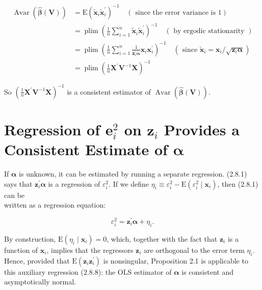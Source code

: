 \documentclass[10pt]{article}
\begin{document}
\begin{align*}
\operatorname{Avar}(\widehat{\boldsymbol{\beta}}(\mathbf{V})) & =\mathrm{E}\left(\tilde{\mathbf{x}}_{i} \tilde{\mathbf{x}}_{i}^{\prime}\right)^{-1} \quad(\text { since the error variance is } 1) \\
& =\operatorname{plim}\left(\frac{1}{n} \sum_{i=1}^{n} \tilde{\mathbf{x}}_{i} \tilde{\mathbf{x}}_{i}^{\prime}\right)^{-1} \quad(\text { by ergodic stationarity }) \\
& =\operatorname{plim}\left(\frac{1}{n} \sum_{i=1}^{n} \frac{1}{\mathbf{z}_{i}^{\prime} \boldsymbol{\alpha}} \mathbf{x}_{i} \mathbf{x}_{i}^{\prime}\right)^{-1} \quad\left(\text { since } \tilde{\mathbf{x}}_{i}=\mathbf{x}_{i} / \sqrt{\mathbf{z}_{i} \boldsymbol{\alpha}}\right) \\
& =\operatorname{plim}\left(\frac{1}{n} \mathbf{X}^{\prime} \mathbf{V}^{-1} \mathbf{X}\right)^{-1} \tag{2.8.7}
\end{align*}


So $\left(\frac{1}{n} \mathbf{X}^{\prime} \mathbf{V}^{-1} \mathbf{X}\right)^{-1}$ is a consistent estimator of $\operatorname{Avar}(\widehat{\boldsymbol{\beta}}(\mathbf{V}))$.

\section*{Regression of $\boldsymbol{e}_{i}^{2}$ on $\mathbf{z}_{i}$ Provides a Consistent Estimate of $\boldsymbol{\alpha}$}
If $\boldsymbol{\alpha}$ is unknown, it can be estimated by running a separate regression. (2.8.1) says that $\mathbf{z}_{i}^{\prime} \boldsymbol{\alpha}$ is a regression of $\varepsilon_{i}^{2}$. If we define $\eta_{i} \equiv \varepsilon_{i}^{2}-\mathrm{E}\left(\varepsilon_{i}^{2} \mid \mathbf{x}_{i}\right)$, then (2.8.1) can be\\
written as a regression equation:


\begin{equation*}
\varepsilon_{i}^{2}=\mathbf{z}_{i}^{\prime} \boldsymbol{\alpha}+\eta_{i} . \tag{2.8.8}
\end{equation*}


By construction, $\mathrm{E}\left(\eta_{i} \mid \mathbf{x}_{i}\right)=0$, which, together with the fact that $\mathbf{z}_{i}$ is a function of $\mathbf{x}_{i}$, implies that the regressors $\mathbf{z}_{i}$ are orthogonal to the error term $\eta_{i}$. Hence, provided that $\mathrm{E}\left(\mathbf{z}_{i} \mathbf{z}_{i}^{\prime}\right)$ is nonsingular, Proposition 2.1 is applicable to this auxiliary regression (2.8.8): the OLS estimator of $\boldsymbol{\alpha}$ is consistent and asymptotically normal.
\end{document}
